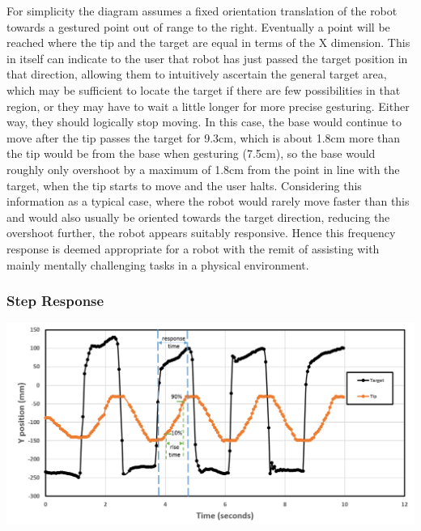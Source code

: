 \documentclass[11pt]{article}
\begin{document}
For simplicity the diagram assumes a fixed orientation translation of the robot towards a gestured point out of range to the right. Eventually a point will be reached where the tip and the target are equal in terms of the X dimension. This in itself can indicate to the user that robot has just passed the target position in that direction, allowing them to intuitively ascertain the general target area, which may be sufficient to locate the target if there are few possibilities in that region, or they may have to wait a little longer for more precise gesturing. Either way, they should logically stop moving. In this case, the base would continue to move after the tip passes the target for 9.3cm, which is about 1.8cm more than the tip would be from the base when gesturing (7.5cm), so the base would roughly only overshoot by a maximum of 1.8cm  from the point in line with the target, when the tip starts to move and the user halts. Considering this information as a typical case, where the robot would rarely move faster than this and would also usually be oriented towards the target direction, reducing the overshoot further, the robot appears suitably responsive. Hence this frequency response is deemed appropriate for a robot with the remit of assisting with mainly mentally challenging tasks in a physical environment. 



\subsubsection{Step Response}

\begin{center}
\includegraphics[width=\textwidth]{images/stepResponse.png}
\label{figure:stepResponse}
\end{center}
\end{document}
